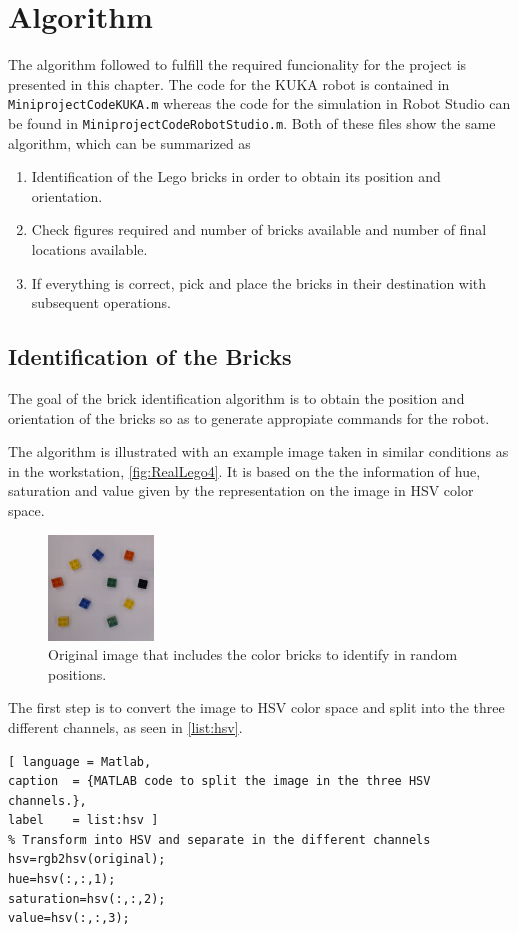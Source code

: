 \chapter{Algorithm}\label{chap:algorithm}
The algorithm followed to fulfill the required funcionality for the project is presented in this chapter. The code for the KUKA robot is contained in \lstinline[style=matlabinline]{MiniprojectCodeKUKA.m} whereas the code for the simulation in Robot Studio can be found in \lstinline[style=matlabinline]{MiniprojectCodeRobotStudio.m}. Both of these files show the same algorithm, which can be summarized as
\begin{enumerate}
	\item Identification of the Lego bricks in order to obtain its position and orientation.
	\item Check figures required and number of bricks available and number of final locations available. 
	\item If everything is correct, pick and place the bricks in their destination with subsequent operations.
\end{enumerate}
\section{Identification of the Bricks}
The goal of the brick identification algorithm is to obtain the position and orientation of the bricks so as to generate appropiate commands for the robot.

The algorithm is illustrated with an example image taken in similar conditions as in the workstation, \autoref{fig:RealLego4}. It is based on the the information of hue, saturation and value given by the representation on the image in HSV color space.

\begin{figure}[H]
	\includegraphics[width=0.25\textwidth]{figures/original.png}
	\caption{Original image that includes the color bricks to identify in random positions.}
	\label{fig:RealLego4}
\end{figure}

The first step is to convert the image to HSV color space and split into the three different channels, as seen in \autoref{list:hsv}.
%
\begin{lstlisting}[ language = Matlab,
caption  = {MATLAB code to split the image in the three HSV channels.},
label    = list:hsv ]
% Transform into HSV and separate in the different channels
hsv=rgb2hsv(original);
hue=hsv(:,:,1);
saturation=hsv(:,:,2);
value=hsv(:,:,3);
\end{lstlisting}

